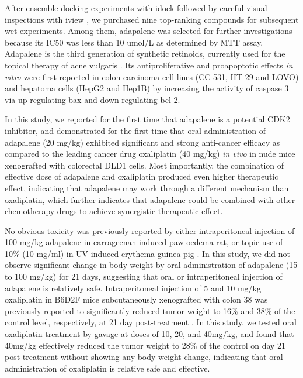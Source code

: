 After ensemble docking experiments with idock \citep{1153,1362} followed by careful visual inspections with iview \citep{1366}, we purchased nine top-ranking compounds for subsequent wet experiments. Among them, adapalene was selected for further investigations because its IC50 was less than 10 umol/L as determined by MTT assay. Adapalene is the third generation of synthetic retinoids, currently used for the topical therapy of acne vulgaris \citep{1599}. Its antiproliferative and proapoptotic effects \textit{in vitro} were first reported in colon carcinoma cell lines (CC-531, HT-29 and LOVO) \citep{1600} and hepatoma cells (HepG2 and Hep1B) \citep{1601} by increasing the activity of caspase 3 via up-regulating bax and down-regulating bcl-2.

In this study, we reported for the first time that adapalene is a potential CDK2 inhibitor, and demonstrated for the first time that oral administration of adapalene (20 mg/kg) exhibited significant and strong anti-cancer efficacy as compared to the leading cancer drug oxaliplatin (40 mg/kg) \textit{in vivo} in nude mice xenografted with colorectal DLD1 cells. Most importantly, the combination of effective dose of adapalene and oxaliplatin produced even higher therapeutic effect, indicating that adapalene may work through a different mechanism than oxaliplatin, which further indicates that adapalene could be combined with other chemotherapy drugs to achieve synergistic therapeutic effect.

No obvious toxicity was previously reported by either intraperitoneal injection of 100 mg/kg adapalene in carrageenan induced paw oedema rat, or topic use of 10\% (10 mg/ml) in UV induced erythema guinea pig \citep{1604}. In this study, we did not observe significant change in body weight by oral administration of adapalene (15 to 100 mg/kg) for 21 days, suggesting that oral or intraperitoneal injection of adapalene is relatively safe. Intraperitoneal injection of 5 and 10 mg/kg oxaliplatin in B6D2F mice subcutaneously xenografted with colon 38 was previously reported to significantly reduced tumor weight to 16\% and 38\% of the control level, respectively, at 21 day post-treatment \citep{1605}. In this study, we tested oral oxaliplatin treatment by gavage at doses of 10, 20, and 40mg/kg, and found that 40mg/kg effectively reduced the tumor weight to 28\% of the control on day 21 post-treatment without showing any body weight change, indicating that oral administration of oxaliplatin is relative safe and effective.


